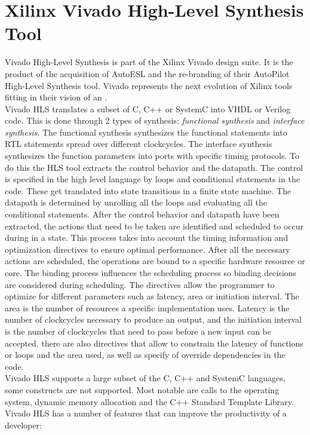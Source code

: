 \section{Xilinx Vivado High-Level Synthesis Tool}
\label{sec:vivado_HLS}
Vivado High-Level Synthesis is part of the Xilinx Vivado design suite. It is the product of the acquisition of AutoESL and the re-branding of their AutoPilot High-Level Synthesis tool. Vivado represents the next evolution of Xilinx tools fitting in their vision of an .\\
Vivado HLS translates a subset of C, C++ or SystemC into VHDL or Verilog code. This is done through 2 types of synthesis: \emph{functional synthesis} and \emph{interface synthesis}. The functional synthesis synthesizes the functional statements into RTL statements spread over different clockcycles. The interface synthesis synthesizes the function parameters into ports with specific timing protocols. To do this the HLS tool extracts the control behavior and the datapath. The control is specified in the high level language by loops and conditional statements in the code. These get translated into state transitions in a finite state machine. The datapath is determined by unrolling all the loops and evaluating all the conditional statements. After the control behavior and datapath have been extracted, the actions that need to be taken are identified and scheduled to occur during in a state. This process takes into account the timing information and optimization directives to ensure optimal performance. After all the necessary actions are scheduled, the operations are bound to a specific hardware resource or core. The binding process influences the scheduling process so binding decisions are considered during scheduling. The directives allow the programmer to optimize for different parameters such as latency, area or initiation interval. The area is the number of resources a specific implementation uses. Latency is the number of clockcycles necessary to produce an output, and the initiation interval is the number of clockcycles that need to pass before a new input can be accepted. there are also directives that allow to constrain the latency of functions or loops and the area used, as well as specify of override dependencies in the code.\\
Vivado HLS supports a large subset of the C, C++ and SystemC languages, some constructs are not supported. Most notable are calls to the operating system, dynamic memory allocation and the C++ Standard Template Library. 
Vivado HLS has a number of features that can improve the productivity of a developer:

